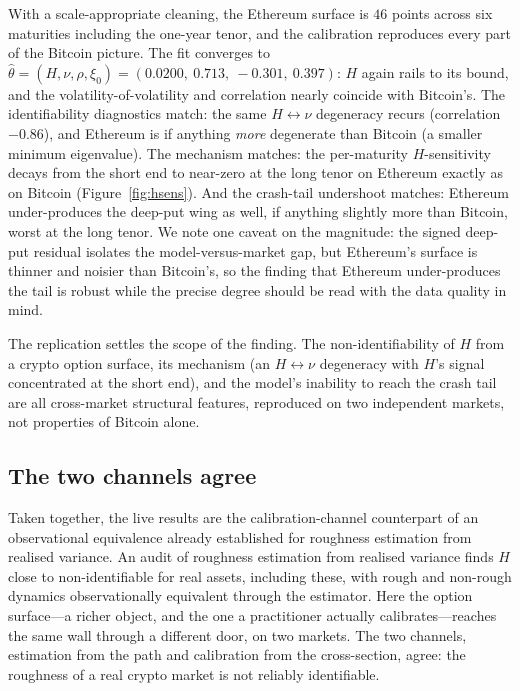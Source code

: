 \documentclass[11pt]{article}
\begin{document}
With a scale-appropriate cleaning, the Ethereum surface is $46$ points across six maturities including
the one-year tenor, and the calibration reproduces every part of the Bitcoin picture. The fit converges
to $\hat\theta = (H,\nu,\rho,\xi_0) = (0.0200,\ 0.713,\ -0.301,\ 0.397)$: $H$ again rails to its bound,
and the volatility-of-volatility and correlation nearly coincide with Bitcoin's. The identifiability
diagnostics match: the same $H\leftrightarrow\nu$ degeneracy recurs (correlation
$-0.86$), and Ethereum is if anything \emph{more} degenerate than Bitcoin (a smaller minimum
eigenvalue). The mechanism matches: the per-maturity
$H$-sensitivity decays from the short end to near-zero at the long tenor on Ethereum exactly as on
Bitcoin (Figure~\ref{fig:hsens}). And the crash-tail undershoot matches: Ethereum under-produces the
deep-put wing as well, if anything slightly more than Bitcoin, worst at the long tenor. We note one
caveat on the magnitude: the signed deep-put residual isolates the model-versus-market gap, but
Ethereum's surface is thinner and noisier than Bitcoin's, so the finding that Ethereum under-produces
the tail is robust while the precise degree should be read with the data quality in mind.

The replication settles the scope of the finding. The non-identifiability of $H$ from a crypto option
surface, its mechanism (an $H\leftrightarrow\nu$ degeneracy with $H$'s signal concentrated at the
short end), and the model's inability to reach the crash tail are all cross-market structural
features, reproduced on two independent markets, not properties of Bitcoin alone.

\subsection{The two channels agree}

Taken together, the live results are the calibration-channel counterpart of an observational
equivalence already established for roughness estimation from realised variance. An audit of roughness
estimation from realised variance finds $H$ close to non-identifiable for real assets, including these,
with rough and non-rough dynamics observationally equivalent through the estimator. Here the option
surface---a richer object, and the one a practitioner actually calibrates---reaches the same wall
through a different door, on two markets. The two channels, estimation from the path and calibration
from the cross-section, agree: the roughness of a real crypto market is not reliably identifiable.
\end{document}
